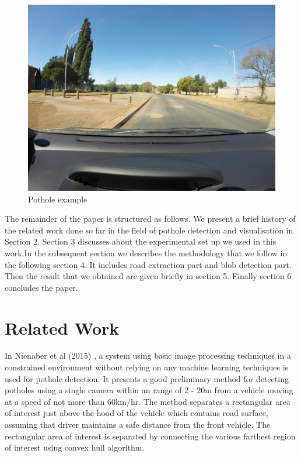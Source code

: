 \documentclass[journal]{IEEEtran}
\begin{document}
\begin{figure}[!h]
\begin{center}
\includegraphics[scale=0.035]{Images/pothole_example.JPG}
\end{center}
\caption{Pothole example}
\end{figure}

The remainder of the paper is structured as follows. We present a brief history of the related work done so far in the field of pothole detection and visualisation in Section 2. Section 3 discusses about the experimental set up we used in this work.In the subsequent section we describes the methodology that we follow in the following section 4. It includes road extraction part and blob detection part. Then the result that we obtained are given briefly in section 5. Finally section 6 concludes the paper.

\section{Related Work}
In Nienaber et al (2015) \cite{paperone}, a system using basic image processing techniques in a constrained environment without relying on any machine learning techniques is used for pothole detection. It presents a good preliminary method for detecting potholes using a single camera within an range of 2 - 20m from a vehicle moving at a speed of not more than 60km/hr. The method separates a rectangular area of interest just above the hood of the vehicle which contains road surface, assuming that driver maintains a safe distance from the front vehicle. The rectangular area of interest is separated by connecting the various farthest region of interest using convex hull algorithm.
\end{document}
